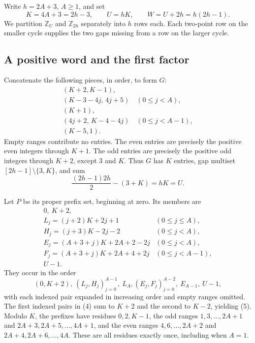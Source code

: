 \documentclass[11pt,a4paper]{article}
\begin{document}
Write \(h=2A+3\), \(A\geq1\), and set \[
 K=4A+3=2h-3,\qquad U=hK,\qquad W=U+2h=h(2h-1).
\] We partition \(\mathbb Z_U\) and \(\mathbb Z_{2h}\) separately into \(h\) rows each. Each two-point row on the smaller cycle supplies the two gaps missing from a row on the larger cycle.

\hypertarget{a-positive-word-and-the-first-factor}{%
\subsection{A positive word and the first factor}\label{a-positive-word-and-the-first-factor}}

Concatenate the following pieces, in order, to form \(G\): \begin{equation}
\begin{gathered}
 (K+2,K-1),\\
 (K-3-4j,\,4j+5)\quad(0\leq j<A),\\
 (K+1),\\
 (4j+2,\,K-4-4j)\quad(0\leq j<A-1),\\
 (K-5,1).
\end{gathered}
\tag{4}\label{eq:4}
\end{equation} Empty ranges contribute no entries. The even entries are precisely the positive even integers through \(K+1\). The odd entries are precisely the positive odd integers through \(K+2\), except \(3\) and \(K\). Thus \(G\) has \(K\) entries, gap multiset \([2h-1]\setminus\{3,K\}\), and sum \[
 \frac{(2h-1)2h}{2}-(3+K)=hK=U.
\]

Let \(P\) be its proper prefix set, beginning at zero. Its members are \begin{equation}
\begin{array}{ll}
 0,\ K+2, &\\
 L_j=(j+2)K+2j+1 &(0\leq j\leq A),\\
 H_j=(j+3)K-2j-2 &(0\leq j<A),\\
 E_j=(A+3+j)K+2A+2-2j &(0\leq j<A),\\
 F_j=(A+3+j)K+2A+4+2j &(0\leq j<A-1),\\
 U-1.&
\end{array}
\tag{5}\label{eq:5}
\end{equation} They occur in the order \[
 (0,K+2),\ (L_j,H_j)_{j=0}^{A-1},\ L_A,
 (E_j,F_j)_{j=0}^{A-2},\ E_{A-1},\ U-1,
\] with each indexed pair expanded in increasing order and empty ranges omitted. The first indexed pairs in (4) sum to \(K+2\) and the second to \(K-2\), yielding (5). Modulo \(K\), the prefixes have residues \(0,2,K-1\), the odd ranges \(1,3,\ldots,2A+1\) and \(2A+3,2A+5,\ldots,4A+1\), and the even ranges \(4,6,\ldots,2A+2\) and \(2A+4,2A+6,\ldots,4A\). These are all residues exactly once, including when \(A=1\).
\end{document}

